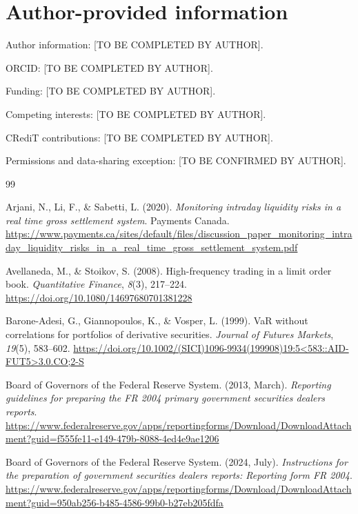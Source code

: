 \documentclass[11pt,a4paper]{article}
\begin{document}
\section*{Author-provided information}
Author information: [TO BE COMPLETED BY AUTHOR].\par
ORCID: [TO BE COMPLETED BY AUTHOR].\par
Funding: [TO BE COMPLETED BY AUTHOR].\par
Competing interests: [TO BE COMPLETED BY AUTHOR].\par
CRediT contributions: [TO BE COMPLETED BY AUTHOR].\par
Permissions and data-sharing exception: [TO BE CONFIRMED BY AUTHOR].\par

\begin{thebibliography}{99}
\raggedright
{} Arjani, N., Li, F., \& Sabetti, L. (2020). \emph{Monitoring intraday liquidity risks in a real time gross settlement system}. Payments Canada. \url{https://www.payments.ca/sites/default/files/discussion_paper_monitoring_intraday_liquidity_risks_in_a_real_time_gross_settlement_system.pdf}

 Avellaneda, M., \& Stoikov, S. (2008). High-frequency trading in a limit order book. \emph{Quantitative Finance}, \emph{8}(3), 217--224. \url{https://doi.org/10.1080/14697680701381228}

 Barone-Adesi, G., Giannopoulos, K., \& Vosper, L. (1999). VaR without correlations for portfolios of derivative securities. \emph{Journal of Futures Markets}, \emph{19}(5), 583--602. \url{https://doi.org/10.1002/(SICI)1096-9934(199908)19:5<583::AID-FUT5>3.0.CO;2-S}

 Board of Governors of the Federal Reserve System. (2013, March). \emph{Reporting guidelines for preparing the FR 2004 primary government securities dealers reports}. \url{https://www.federalreserve.gov/apps/reportingforms/Download/DownloadAttachment?guid=f555fe11-e149-479b-8088-4ed4e9ae1206}

 Board of Governors of the Federal Reserve System. (2024, July). \emph{Instructions for the preparation of government securities dealers reports: Reporting form FR 2004}. \url{https://www.federalreserve.gov/apps/reportingforms/Download/DownloadAttachment?guid=950ab256-b485-4586-99b0-b27eb205fdfa}


\end{thebibliography}
\end{document}
